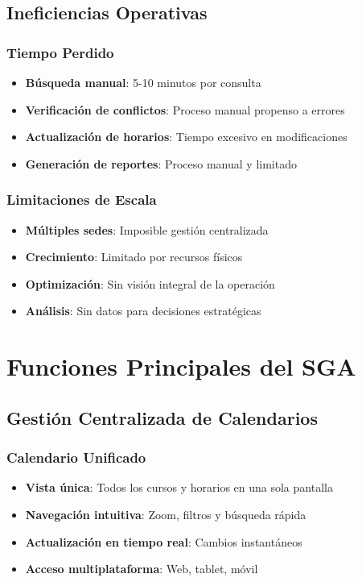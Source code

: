 \documentclass[12pt,a4paper]{article}
\begin{document}
\subsection{Ineficiencias Operativas}

\subsubsection{Tiempo Perdido}
\begin{itemize}
    \item \textbf{Búsqueda manual}: 5-10 minutos por consulta
    \item \textbf{Verificación de conflictos}: Proceso manual propenso a errores
    \item \textbf{Actualización de horarios}: Tiempo excesivo en modificaciones
    \item \textbf{Generación de reportes}: Proceso manual y limitado
\end{itemize}

\subsubsection{Limitaciones de Escala}
\begin{itemize}
    \item \textbf{Múltiples sedes}: Imposible gestión centralizada
    \item \textbf{Crecimiento}: Limitado por recursos físicos
    \item \textbf{Optimización}: Sin visión integral de la operación
    \item \textbf{Análisis}: Sin datos para decisiones estratégicas
\end{itemize}

\section{Funciones Principales del SGA}

\subsection{Gestión Centralizada de Calendarios}

\subsubsection{Calendario Unificado}
\begin{itemize}
    \item \textbf{Vista única}: Todos los cursos y horarios en una sola pantalla
    \item \textbf{Navegación intuitiva}: Zoom, filtros y búsqueda rápida
    \item \textbf{Actualización en tiempo real}: Cambios instantáneos
    \item \textbf{Acceso multiplataforma}: Web, tablet, móvil
\end{itemize}
\end{document}
